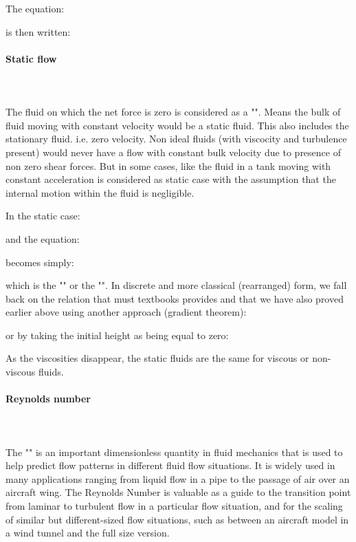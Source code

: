 	The equation:
	
	is then written:
	
	
	\paragraph{Static flow}\mbox{}\\\\
	The fluid on which the net force is zero is considered as a "". Means the bulk of fluid moving with constant velocity would be a static fluid. This also includes the stationary fluid. i.e. zero velocity. Non ideal fluids (with viscocity and turbulence present) would never have a flow with constant bulk velocity due to presence of non zero shear forces. But in some cases, like the fluid in a tank moving with constant acceleration is considered as static case with the assumption that the internal motion within the fluid is negligible.
	
	In the static case:
	
	and the equation:
	
	becomes simply:
	
	which is the "" or the "". In discrete and more classical (rearranged) form, we fall back on the relation that must textbooks provides and that we have also proved earlier above using another approach (gradient theorem):
	
	or by taking the initial height as being equal to zero:
	
	\begin{tcolorbox}[title=Remark,colframe=black,arc=10pt]
	As the viscosities disappear, the static fluids are the same for viscous or non-viscous fluids.
	\end{tcolorbox}
	
	\paragraph{Reynolds number}\mbox{}\\\\
	The "" is an important dimensionless quantity in fluid mechanics that is used to help predict flow patterns in different fluid flow situations. It is widely used in many applications ranging from liquid flow in a pipe to the passage of air over an aircraft wing. The Reynolds Number is valuable as a guide to the transition point from laminar to turbulent flow in a particular flow situation, and for the scaling of similar but different-sized flow situations, such as between an aircraft model in a wind tunnel and the full size version.
	
